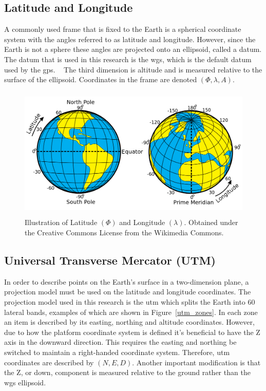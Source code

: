 \subsection{Latitude and Longitude}

A commonly used frame that is fixed to the Earth is a spherical coordinate system with the angles referred to as latitude and longitude. However, since the Earth is not a sphere these angles are projected onto an ellipsoid, called a datum.  The datum that is used in this research is the \ac{wgs}, which is the default datum used by the \acf{gps}. ~\citep{datums:2016}  The third dimension is altitude and is measured relative to the surface of the ellipsoid.  Coordinates in the frame are denoted $(\Phi, \lambda, A)$.

\begin{figure}
	\centering
    \includegraphics[height=2.5in]{figures/latitudelongitude.png}
    \caption[Latitude and longitude]{Illustration of Latitude $(\Phi)$ and Longitude $(\lambda)$. Obtained under the Creative Commons License from the Wikimedia Commons.}
\end{figure}

\subsection{Universal Transverse Mercator (UTM)}
\label{section:utm}

In order to describe points on the Earth's surface in a two-dimension plane, a projection model must be used on the latitude and longitude coordinates.  The projection model used in this research is the \acf{utm} which splits the Earth into 60 lateral bands, examples of which are shown in Figure~\ref{utm_zones}.  In each zone an item is described by its easting, northing and altitude coordinates.  However, due to how the platform coordinate system is defined it's beneficial to have the Z axis in the downward direction.  This requires the easting and northing be switched to maintain a right-handed coordinate system. Therefore, \acf{utm} coordinates are described by $(N,E,D)$.  Another important modification is that the Z, or down, component is measured relative to the ground rather than the \ac{wgs} ellipsoid. 

